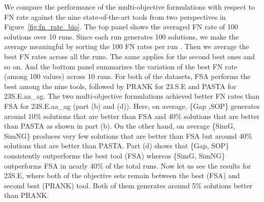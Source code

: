

We compare the performance of the multi-objective formulations with respect to FN rate against the nine state-of-the-art tools from two perspectives in Figure~\ref{fig:fn_rate_bio}. The top panel shows the averaged FN rate of 100 solutions over 10 runs. Since each run generates 100 solutions, we make the average meaningful by sorting the 100 FN rates per run . Then we average the best FN rates across all the runs. The same applies for the second best ones and so on. And the bottom panel summarizes the variation of the best FN rate (among 100 values) across 10 runs. For both of the datasets, FSA performs the best among the nine tools, followed by PRANK for 23.S.E and PASTA for 23S.E.aa\_ag. The two multi-objective formulations achieved better FN rates than FSA for 23S.E.aa\_ag (part (b) and (d)). Here, on average, \{Gap ,SOP\} generates around 10\% solutions that are better than FSA and 40\% solutions that are better than PASTA as shown in part (b). On the other hand, on average \{SimG, SimNG\} produces very few solutions that are better than FSA but around 40\% solutions that are better than PASTA. Part (d) shows that \{Gap, SOP\} consistently outperforms the best tool (FSA) whereas \{SimG, SimNG\} outperforms FSA in nearly 40\% of the total runs. Now let us see the results for 23S.E, where both of the objective sets remain between the best (FSA) and second best (PRANK) tool. Both of them generates around 5\% solutions better than PRANK.

